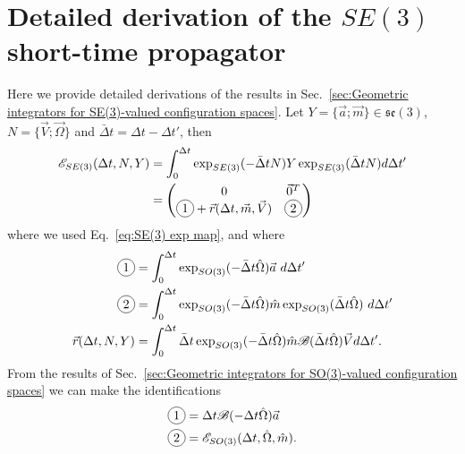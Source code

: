\documentclass[]{cam-thesis}
\newcommand*\circled[1]{\tikz[baseline=(char.base)]{
            \node[shape=circle,draw,inner sep=2pt] (char) {#1};}}
\begin{document}
\chapter{Detailed derivation of the $SE(3)$ short-time propagator} \label{app:Detailed derivation of the SE(3) short-time propagator}

Here we provide detailed derivations of the results in Sec.~\ref{sec:Geometric integrators for SE(3)-valued configuration spaces}. Let $Y = \{ \vec{a} ; \vec{m} \} \in \mathfrak{se}(3)$, $N = \{ \vec{V} ; \vec{\Omega} \}$ and $\bar{\Delta} t = \Delta t - \Delta t'$, then
\begin{equation} \label{eq:E thingie SE(3)}
\begin{aligned}
	\mathscr{E}_{SE(3)}(\Delta t, N, Y) &  = \int_0^{\Delta t} \exp_{SE(3)}(-\bar{\Delta} t N) Y \exp_{SE(3)}(\bar{\Delta} t N) d \Delta t' \\
	& = \begin{pmatrix}
		0 & \vec{0}^T \\
		\circled{1} + \vec{r}(\Delta t, \vec{m}, \vec{V}) & \circled{2}
		\end{pmatrix}
\end{aligned}
\end{equation}
where we used Eq.~\ref{eq:SE(3) exp map}, and where
\begin{subequations}
	\begin{align}
	\circled{1} & = \int_0^{\Delta t} \exp_{SO(3)}(-\bar{\Delta} t \hat{\Omega}) \vec{a}\  d \Delta t' \\
	\circled{2} & = \int_0^{\Delta t} \exp_{SO(3)}(-\bar{\Delta} t \hat{\Omega}) \hat{m} \exp_{SO(3)}( \bar{\Delta} t \hat{\Omega})\ d \Delta t' \\
	\vec{r}(\Delta t, N, Y) & = \int_0^{\Delta t} \bar{\Delta} t \exp_{SO(3)}(-\bar{\Delta} t \hat{\Omega}) \hat{m} \mathscr{B}(\bar{\Delta} t \hat{\Omega}) \vec{V}  d \Delta t'.
	\end{align}
\end{subequations}
From the results of Sec.~\ref{sec:Geometric integrators for SO(3)-valued configuration spaces} we can make the identifications
\begin{subequations}
	\begin{align}
		\circled{1} & = \Delta t \mathscr{B}( - \Delta t \hat{\Omega}) \vec{a} \\
		\circled{2} & = \mathscr{E}_{SO(3)}(\Delta t, \hat{\Omega}, \hat{m}).
	\end{align}
\end{subequations}
\end{document}
